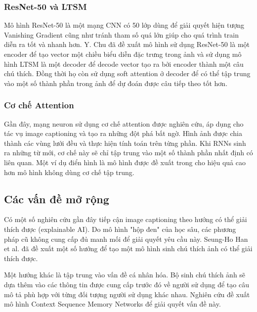 \documentclass[conference]{IEEEtran}
\begin{document}
\subsubsection{ResNet-50 và LTSM}
Mô hình ResNet-50 là một mạng CNN có 50 lớp dùng để giải quyết hiện tượng Vanishing Gradient cũng như tránh tham số quá lớn giúp cho quá trình train diễn ra tốt và nhanh hơn.  Y. Chu \cite{b6} đã đề xuất mô hình sử dụng ResNet-50 là một encoder để tạo vector một chiều biểu diễn đặc trưng trong ảnh và sử dụng mô hình LTSM là một decoder để decode vector tạo ra bởi encoder thành một câu chú thích. Đồng thời họ còn sử dụng soft attention ở decoder để có thể tập trung vào một số thành phần trong ảnh để dự đoán được câu tiếp theo tốt hơn. 
\subsubsection{Cơ chế Attention} 
Gần đây, mạng neuron sử dụng cơ chế attention được nghiên cứu, áp dụng cho tác vụ image captioning và tạo ra những đột phá bất ngờ.
Hình ảnh được chia thành các vùng lưới đều và thực hiện tính toán trên từng phần.
Khi RNNs sinh ra những từ mới, cơ chế này sẽ chỉ tập trung vào một số thành phần nhất định có liên quan.
Một ví dụ điển hình là mô hình được đề xuất trong \cite{b5} cho hiệu quả cao hơn mô hình không dùng cơ chế tập trung.

\subsection{Các vấn đề mở rộng}
Có một số nghiên cứu gần đây tiếp cận image captioning theo hướng có thể giải thích được (explainable AI). Do mô hình "hộp đen" của học sâu, các phương pháp cũ không cung cấp đủ manh mối để giải quyết yêu cầu này. Seung-Ho Han et al. \cite{b7} đã đề xuất một số hướng để tạo một mô hình sinh chú thích ảnh có thể giải thích được.

Một hướng khác là tập trung vào vấn đề cá nhân hóa. Bộ sinh chú thích ảnh sẽ dựa thêm vào các thông tin được cung cấp trước đó về người sử dụng để tạo câu mô tả phù hợp với từng đối tượng người sử dụng khác nhau. Nghiên cứu \cite{b8} đề xuất mô hình Context Sequence Memory Networks để giải quyết vấn đề này.
\end{document}
